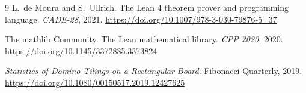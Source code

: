 \documentclass[11pt]{article}
\begin{document}
\begin{thebibliography}{9}
L.~de Moura and S.~Ullrich.
\newblock The Lean 4 theorem prover and programming language.
\newblock \emph{CADE-28}, 2021. \url{https://doi.org/10.1007/978-3-030-79876-5_37}

The mathlib Community.
\newblock The Lean mathematical library.
\newblock \emph{CPP 2020}, 2020. \url{https://doi.org/10.1145/3372885.3373824}

\emph{Statistics of Domino Tilings on a Rectangular Board}.
\newblock Fibonacci Quarterly, 2019.
\newblock \url{https://doi.org/10.1080/00150517.2019.12427625}
\end{thebibliography}
\end{document}
